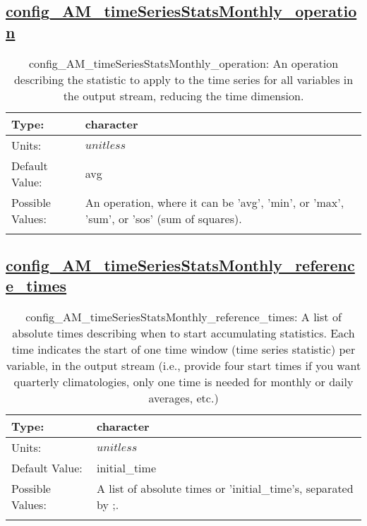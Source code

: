 \subsection[config\_AM\_timeSeriesStatsMonthly\_operation]{\hyperref[sec:nm_tab_AM_timeSeriesStatsMonthly]{config\_AM\_timeSeriesStatsMonthly\_operation}}
\label{subsec:nm_sec_config_AM_timeSeriesStatsMonthly_operation}
\begin{center}
\begin{longtable}{| p{2.0in} || p{4.0in} |}
    \hline
    Type: & character \\
    \hline
    Units: & $unitless$ \\
    \hline
    Default Value: & avg \\
    \hline
    Possible Values: & An operation, where it can be 'avg', 'min', or 'max', 'sum', or 'sos' (sum of squares). \\
    \hline
    \caption{config\_AM\_timeSeriesStatsMonthly\_operation: An operation describing the statistic to apply to the time series for all variables in the output stream, reducing the time dimension.}
\end{longtable}
\end{center}
\subsection[config\_AM\_timeSeriesStatsMonthly\_reference\_times]{\hyperref[sec:nm_tab_AM_timeSeriesStatsMonthly]{config\_AM\_timeSeriesStatsMonthly\_reference\_times}}
\label{subsec:nm_sec_config_AM_timeSeriesStatsMonthly_reference_times}
\begin{center}
\begin{longtable}{| p{2.0in} || p{4.0in} |}
    \hline
    Type: & character \\
    \hline
    Units: & $unitless$ \\
    \hline
    Default Value: & initial\_time \\
    \hline
    Possible Values: & A list of absolute times or 'initial\_time's, separated by ;. \\
    \hline
    \caption{config\_AM\_timeSeriesStatsMonthly\_reference\_times: A list of absolute times describing when to start accumulating statistics. Each time indicates the start of one time window (time series statistic) per variable, in the output stream (i.e., provide four start times if you want quarterly climatologies, only one time is needed for monthly or daily averages, etc.)}
\end{longtable}
\end{center}
